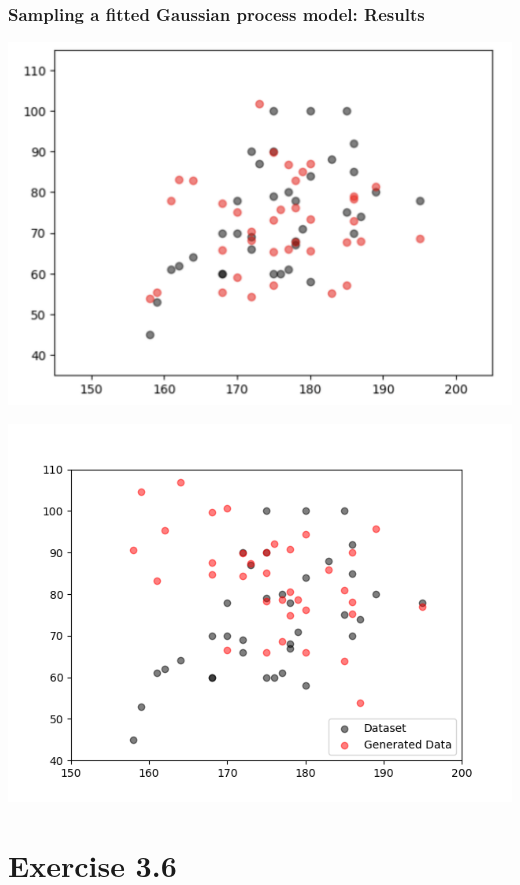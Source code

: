 \documentclass[10pt,aspectratio=169,handout]{beamer}
\begin{document}
\begin{frame}
    \frametitle{Sampling a fitted Gaussian process model: Results}

    \begin{minipage}{0.49\textwidth}
        \includegraphics[width=\textwidth]{images/ex3.5.png}
    \end{minipage}
    \begin{minipage}{0.49\textwidth}
        \includegraphics[width=\textwidth]{images/task-3-5-4.png}
    \end{minipage}

\end{frame}

\section{Exercise 3.6}
\end{document}
